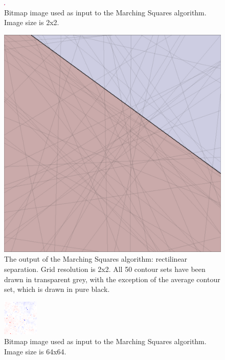 \documentclass[12pt]{article}
\begin{document}
\begin{figure} 
\centering
  \includegraphics[width = 3 in]{image_avg_rectilinear.png}
  \caption{Bitmap image used as input to the Marching Squares algorithm.
Image size is 2x2.
}
\end{figure}

\begin{figure} 
\centering
  \includegraphics[width = 3 in]{rectilinear.png}
  \caption{The output of the Marching Squares algorithm: rectilinear separation. 
Grid resolution is 2x2.
All 50 contour sets have been drawn in transparent grey, with the exception of the average contour set, which is drawn in pure black.
}
\end{figure}



\begin{figure} 
\centering
  \includegraphics[width = 3 in]{image_avg_no_blur.png}
  \caption{Bitmap image used as input to the Marching Squares algorithm.
Image size is 64x64.
}
\end{figure}
\end{document}
